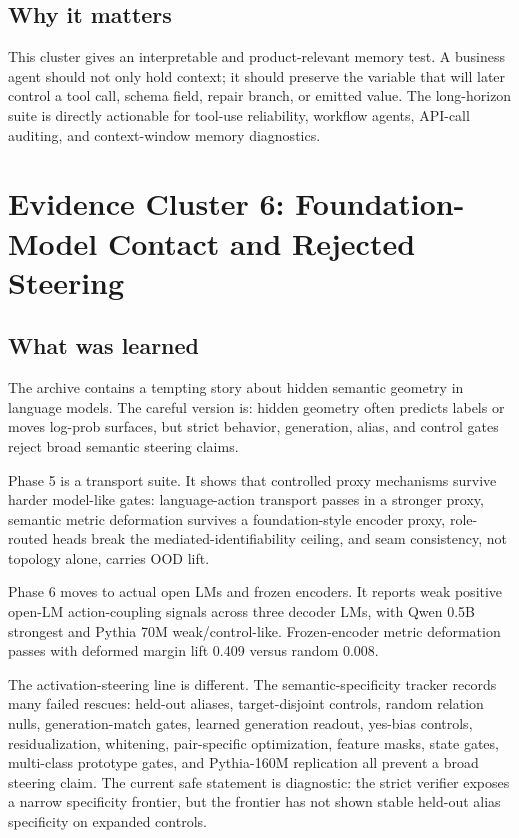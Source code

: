 \documentclass[11pt]{article}
\begin{document}
\subsection{Why it matters}

This cluster gives an interpretable and product-relevant memory test. A
business agent should not only hold context; it should preserve the variable
that will later control a tool call, schema field, repair branch, or emitted
value. The long-horizon suite is directly actionable for tool-use reliability,
workflow agents, API-call auditing, and context-window memory diagnostics.

\section{Evidence Cluster 6: Foundation-Model Contact and Rejected Steering}

\subsection{What was learned}

The archive contains a tempting story about hidden semantic geometry in
language models. The careful version is: hidden geometry often predicts labels
or moves log-prob surfaces, but strict behavior, generation, alias, and control
gates reject broad semantic steering claims.

Phase 5 is a transport suite. It shows that controlled proxy mechanisms survive
harder model-like gates: language-action transport passes in a stronger proxy,
semantic metric deformation survives a foundation-style encoder proxy,
role-routed heads break the mediated-identifiability ceiling, and seam
consistency, not topology alone, carries OOD lift.

Phase 6 moves to actual open LMs and frozen encoders. It reports weak positive
open-LM action-coupling signals across three decoder LMs, with Qwen 0.5B
strongest and Pythia 70M weak/control-like. Frozen-encoder metric deformation
passes with deformed margin lift 0.409 versus random 0.008.

The activation-steering line is different. The semantic-specificity tracker
records many failed rescues: held-out aliases, target-disjoint controls,
random relation nulls, generation-match gates, learned generation readout,
yes-bias controls, residualization, whitening, pair-specific optimization,
feature masks, state gates, multi-class prototype gates, and Pythia-160M
replication all prevent a broad steering claim. The current safe statement is
diagnostic: the strict verifier exposes a narrow specificity frontier, but the
frontier has not shown stable held-out alias specificity on expanded controls.
\end{document}

